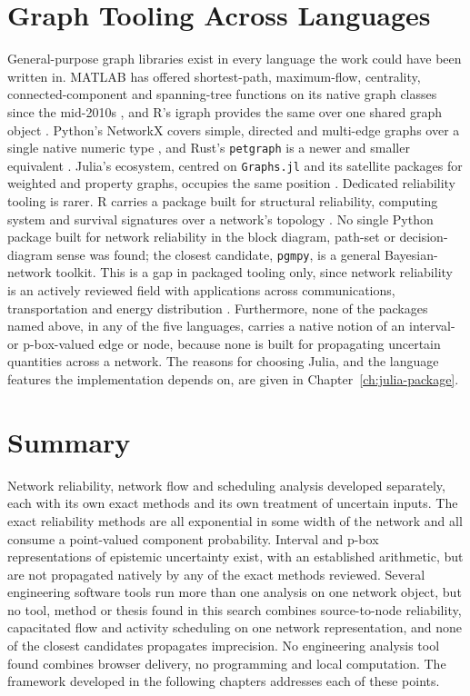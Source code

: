 \documentclass[12pt]{report}
\begin{document}
\section{Graph Tooling Across Languages}
\label{sec:bg-language}

General-purpose graph libraries exist in every language the work could have been written in.
MATLAB has offered shortest-path, maximum-flow, centrality, connected-component and
spanning-tree functions on its native graph classes since the mid-2010s
\cite{mathworks_graphalgorithms}, and R's igraph provides the same over one shared graph object
\cite{csardi2006igraph}. Python's NetworkX covers simple, directed and multi-edge graphs over
a single native numeric type \cite{hagberg2008networkx}, and Rust's \texttt{petgraph} is a
newer and smaller equivalent \cite{petgraph}. Julia's ecosystem, centred on \texttt{Graphs.jl}
and its satellite packages for weighted and property graphs, occupies the same position
\cite{bezanson2017julia}. Dedicated reliability tooling is rarer. R carries a package built for
structural reliability, computing system and survival signatures over a network's topology
\cite{aslett_reliabilitytheory}. No single Python package built for network reliability in the
block diagram, path-set or decision-diagram sense was found; the closest candidate,
\texttt{pgmpy}, is a general Bayesian-network toolkit. This is a gap in packaged tooling only, since network reliability is an actively reviewed field with applications across
communications, transportation and energy distribution \cite{gaur2021literature}. Furthermore, none of the packages named above, in any of the five languages, carries a native
notion of an interval- or p-box-valued edge or node, because none is built for propagating
uncertain quantities across a network. The reasons for choosing Julia, and the language features the implementation depends
on, are given in Chapter~\ref{ch:julia-package}.

\section{Summary}
\label{sec:bg-summary}

Network reliability, network flow and scheduling analysis developed separately, each with
its own exact methods and its own treatment of uncertain inputs. The
exact reliability methods are all exponential in some width of the network and all consume a
point-valued component probability. Interval and p-box representations of epistemic
uncertainty exist, with an established arithmetic, but are not propagated natively by any of
the exact methods reviewed. Several engineering software tools run more than one analysis on one network object, but
no tool, method or thesis found in this search combines
source-to-node reliability, capacitated flow and activity scheduling on one network
representation, and none of the closest candidates propagates imprecision. No engineering
analysis tool found combines browser delivery, no programming and local computation. The
framework developed in the following chapters addresses each of these points.

\ifdefined\maindoc
\else
\printbibliography
\end{document}
